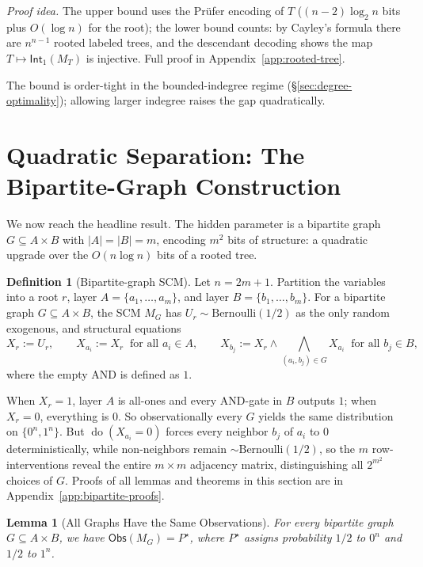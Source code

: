 \documentclass{article}
\theoremstyle{plain}
\newtheorem{lemma}[theorem]{Lemma}
\theoremstyle{definition}
\newtheorem{definition}[theorem]{Definition}
\newcommand{\Obs}{\mathsf{Obs}}
\newcommand{\Int}{\mathsf{Int}}
\DeclareMathOperator{\doop}{do}
\begin{document}
\emph{Proof idea.} The upper bound uses the Pr\"ufer encoding of $T$ ($(n-2)\log_2 n$ bits plus $O(\log n)$ for the root); the lower bound counts: by Cayley's formula there are $n^{n-1}$ rooted labeled trees, and the descendant decoding shows the map $T \mapsto \Int_1(M_T)$ is injective. Full proof in Appendix~\ref{app:rooted-tree}.

The bound is order-tight in the bounded-indegree regime (\S\ref{sec:degree-optimality}); allowing larger indegree raises the gap quadratically.

\section{Quadratic Separation: The Bipartite-Graph Construction}
\label{sec:quadratic}

We now reach the headline result. The hidden parameter is a bipartite graph $G \subseteq A \times B$ with $|A| = |B| = m$, encoding $m^2$ bits of structure: a quadratic upgrade over the $O(n \log n)$ bits of a rooted tree.

\begin{definition}[Bipartite-graph SCM]
\label{def:bipartite-scm}
Let $n = 2m + 1$. Partition the variables into a root $r$, layer $A = \{a_1, \dots, a_m\}$, and layer $B = \{b_1, \dots, b_m\}$. For a bipartite graph $G \subseteq A \times B$, the SCM $M_G$ has $U_r \sim \mathrm{Bernoulli}(1/2)$ as the only random exogenous, and structural equations
\[
X_r := U_r, \qquad X_{a_i} := X_r \;\;\text{for all } a_i \in A, \qquad X_{b_j} := X_r \wedge \!\!\bigwedge_{(a_i, b_j) \in G}\!\! X_{a_i} \;\;\text{for all } b_j \in B,
\]
where the empty AND is defined as $1$.
\end{definition}

When $X_r = 1$, layer $A$ is all-ones and every AND-gate in $B$ outputs $1$; when $X_r = 0$, everything is $0$. So observationally every $G$ yields the same distribution on $\{0^n, 1^n\}$. But $\doop(X_{a_i} = 0)$ forces every neighbor $b_j$ of $a_i$ to $0$ deterministically, while non-neighbors remain $\sim \mathrm{Bernoulli}(1/2)$, so the $m$ row-interventions reveal the entire $m \times m$ adjacency matrix, distinguishing all $2^{m^2}$ choices of $G$. Proofs of all lemmas and theorems in this section are in Appendix~\ref{app:bipartite-proofs}.


\begin{lemma}[All Graphs Have the Same Observations]
\label{lem:bipartite-obs}
For every bipartite graph $G \subseteq A \times B$, we have $\Obs(M_G) = P^\star$, where $P^\star$ assigns probability $1/2$ to $0^n$ and $1/2$ to $1^n$.
\end{lemma}
\end{document}
